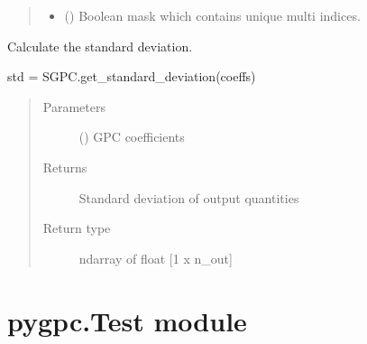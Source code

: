 \documentclass[letterpaper,10pt,english,openany,oneside]{sphinxmanual}
\begin{document}
\begin{fulllineitems}
\begin{fulllineitems}
\begin{quote}
\begin{description}
\begin{itemize}
\item {} 
 () \textendash{} Boolean mask which contains unique multi indices.

\end{itemize}


\end{description}\end{quote}

\end{fulllineitems}


\begin{fulllineitems}
\label{\detokenize{pygpc:pygpc.SGPC.SGPC.get_standard_deviation}}
Calculate the standard deviation.

std = SGPC.get\_standard\_deviation(coeffs)
\begin{quote}\begin{description}
\item[{Parameters}] \leavevmode
{} (\sphinxstyleliteralemphasis{\sphinxupquote{ {[}}}\sphinxstyleliteralemphasis{\sphinxupquote{{]}}}) \textendash{} GPC coefficients

\item[{Returns}] \leavevmode
{} \textendash{} Standard deviation of output quantities

\item[{Return type}] \leavevmode
ndarray of float {[}1 x n\_out{]}

\end{description}\end{quote}

\end{fulllineitems}


\end{fulllineitems}



\section{pygpc.Test module}
\label{\detokenize{pygpc:module-pygpc.Test}}\label{\detokenize{pygpc:pygpc-test-module}}
\end{document}
